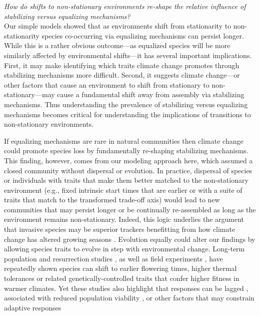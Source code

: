 \documentclass[11pt,letterpaper]{article}
\begin{document}
\emph{How do shifts to non-stationary environments re-shape the relative influence of stabilizing versus equalizing mechanisms?} \\

Our simple models showed that as environments shift from stationarity to non-stationarity species co-occurring via equalizing mechanisms can persist longer. While this is a rather obvious outcome---as equalized species will be more similarly affected by environmental shifts---it has several important implications. First, it may make identifying which traits climate change promotes through stabilizing mechanisms more difficult. Second, it suggests climate change---or other factors that cause an environment to shift from stationary to non-stationary---may cause a fundamental shift away from assembly via stabilizing mechanisms. Thus understanding the prevalence of stabilizing versus equalizing mechanisms \citep[which ecology has worked on for many decades,][]{Caswell:1976np,Chesson:2000vd} becomes critical for understanding the implications of transitions to non-stationary environments. 

If equalizing mechanisms are rare in natural communities then climate change could promote species loss by fundamentally re-shaping stabilizing mechanisms. This finding, however, comes from our modeling approach here, which assumed a closed community without  dispersal or evolution. In practice, dispersal of species or individuals with traits that make them better matched to the non-stationary environment (e.g., fixed intrinsic start times that are earlier or with a suite of traits that match to the transformed trade-off axis) would lead to new communities that may persist longer or be continually re-assembled as long as the environment remains non-stationary. Indeed, this logic underlies the argument that invasive species may be superior trackers benefitting from how climate change has altered growing seasons \citep{Willis:2010al,wolkovich:2010fee}. Evolution equally could alter our findings by allowing species traits to evolve in step with environmental change. Long-term population \citep[e.g.,][]{colautti2017} and resurrection studies \citep{wilczek2014,yousey2018}, as well as field experiments \citep{colautti2017,arab2019}, have repeatedly shown species can shift to earlier flowering times, higher thermal tolerances or related genetically-controlled traits that confer higher fitness in warmer climates. Yet these studies also highlight that responses can be lagged \citep[e.g.,][]{wilczek2014}, associated with reduced population viability \citep[e.g.,][]{colautti2017}, or other factors that may constrain adaptive responses
\end{document}
